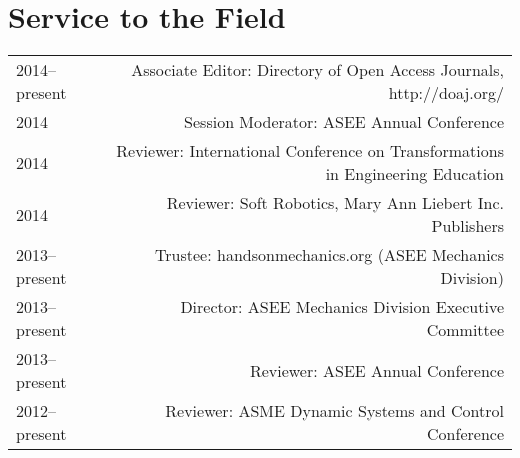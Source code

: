 \section*{Service to the Field}
\begin{tabular}{L!{\VRule}R}
2014--present&Associate Editor: Directory of Open Access Journals, http://doaj.org/\\
2014&Session Moderator: ASEE Annual Conference\\
2014&Reviewer: International Conference on Transformations in Engineering Education\\
2014&Reviewer: Soft Robotics, Mary Ann Liebert Inc. Publishers\\
2013--present&Trustee: handsonmechanics.org (ASEE Mechanics Division)\\
2013--present&Director: ASEE Mechanics Division Executive Committee\\
2013--present&Reviewer: ASEE Annual Conference\\
2012--present&Reviewer: ASME Dynamic Systems and Control Conference\\
\end{tabular}
